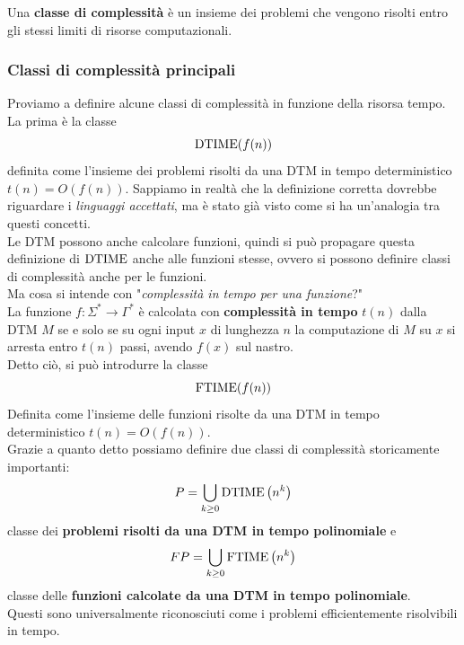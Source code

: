Una \textbf{classe di complessità} è un insieme dei problemi che vengono risolti entro gli stessi limiti di risorse computazionali.\\

\subsubsection{Classi di complessità principali}

Proviamo a definire alcune classi di complessità in funzione della risorsa tempo.\\

La prima è la classe 
$$ \text{DTIME}(f(n)) $$
definita come l'insieme dei problemi risolti da una DTM in tempo deterministico $t(n) = O(f(n))$. Sappiamo in realtà che la definizione corretta dovrebbe riguardare i \textit{linguaggi accettati}, ma è stato già visto come si ha un'analogia tra questi concetti.\\

Le DTM possono anche calcolare funzioni, quindi si può propagare questa definizione di $\text{DTIME}$ anche alle funzioni stesse, ovvero si possono definire classi di complessità anche per le funzioni.\\

Ma cosa si intende con "\textit{complessità in tempo per una funzione}?"\\

La funzione $f: \Sigma^\ast \rightarrow \Gamma^\ast$ è calcolata con \textbf{complessità in tempo} $t(n)$ dalla DTM $M$ se e solo se su ogni input $x$ di lunghezza $n$ la computazione di $M$ su $x$ si arresta entro $t(n)$ passi, avendo $f(x)$ sul nastro.\\

Detto ciò, si può introdurre la classe
$$ \text{FTIME} (f(n)) $$
Definita come l'insieme delle funzioni risolte da una DTM in tempo deterministico $t(n) = O(f(n))$.\\

Grazie a quanto detto possiamo definire due classi di complessità storicamente importanti: 
$$ P = \bigcup_{k \geq 0} \text{DTIME} \left(n^k\right) $$
classe dei \textbf{problemi risolti da una DTM in tempo polinomiale} e 
$$ FP = \bigcup_{k \geq 0} \text{FTIME} \left(n^k\right)$$
classe delle \textbf{funzioni calcolate da una DTM in tempo polinomiale}.\\

Questi sono universalmente riconosciuti come i problemi efficientemente risolvibili in tempo.\\

